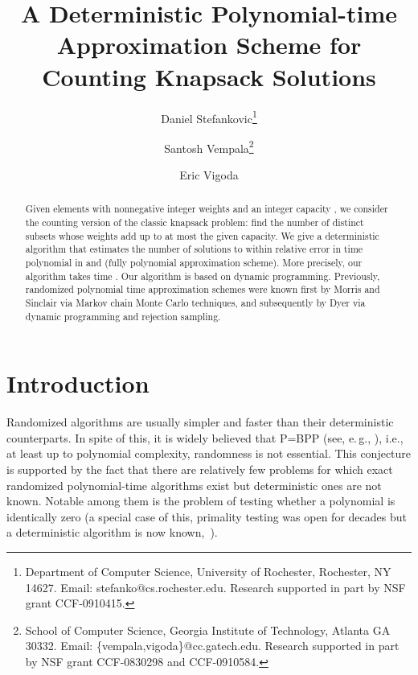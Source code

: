 \documentclass[11pt]{article}
\begin{document}
\title{A Deterministic Polynomial-time Approximation Scheme for Counting Knapsack Solutions}

\author{
Daniel Stefankovic\thanks{
Department of Computer Science, University of Rochester,
Rochester, NY 14627.  Email: stefanko@cs.rochester.edu.
Research supported in part by NSF grant CCF-0910415.
}
\and
Santosh Vempala\thanks{School of Computer Science, Georgia
Institute of Technology, Atlanta GA 30332.
Email: \{vempala,vigoda\}@cc.gatech.edu.
Research supported in part by NSF grant CCF-0830298 and CCF-0910584.}
\and
Eric Vigoda}



\maketitle


\begin{abstract}
Given  elements with nonnegative integer weights  and an integer capacity , we consider the counting version
of the classic knapsack problem: find the number of distinct
subsets whose weights add up to at most the given capacity. We
give a deterministic algorithm that estimates the number of
solutions to within relative error  in time polynomial
in  and  (fully polynomial approximation scheme). More
precisely, our algorithm takes time .
Our algorithm is based on dynamic programming.  Previously,
randomized polynomial time approximation schemes were known first
by Morris and Sinclair via Markov chain Monte Carlo techniques,
and subsequently by Dyer via dynamic programming and rejection
sampling.
\end{abstract}

\section{Introduction}
Randomized algorithms are usually simpler and faster than their
deterministic counterparts. In spite of this, it is widely
believed that P=BPP (see, e.\,g., \cite{AroraBarak}), i.e., at
least up to polynomial complexity, randomness is not essential.
This conjecture is supported by the fact that there are relatively
few problems for which exact randomized polynomial-time algorithms
exist but deterministic ones are not known. Notable among them is
the problem of testing whether a polynomial is identically zero (a
special case of this, primality testing was open for decades but a
deterministic algorithm is now known,~\cite{AKS}).
\end{document}
